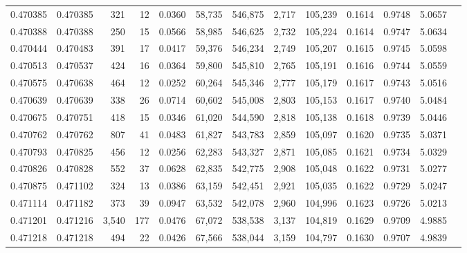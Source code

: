 \begin{tabular}{rrrrrrrrrrrrr}
0.470385 & 0.470385 &   321 &    12 &                                     0.0360 &  58,735 & 546,875 &   2,717 & 105,239 & 0.1614 & 0.9748 & 5.0657 \\
0.470388 & 0.470388 &   250 &    15 &                                     0.0566 &  58,985 & 546,625 &   2,732 & 105,224 & 0.1614 & 0.9747 & 5.0634 \\
0.470444 & 0.470483 &   391 &    17 &                                     0.0417 &  59,376 & 546,234 &   2,749 & 105,207 & 0.1615 & 0.9745 & 5.0598 \\
0.470513 & 0.470537 &   424 &    16 &                                     0.0364 &  59,800 & 545,810 &   2,765 & 105,191 & 0.1616 & 0.9744 & 5.0559 \\
0.470575 & 0.470638 &   464 &    12 &                                     0.0252 &  60,264 & 545,346 &   2,777 & 105,179 & 0.1617 & 0.9743 & 5.0516 \\
0.470639 & 0.470639 &   338 &    26 &                                     0.0714 &  60,602 & 545,008 &   2,803 & 105,153 & 0.1617 & 0.9740 & 5.0484 \\
0.470675 & 0.470751 &   418 &    15 &                                     0.0346 &  61,020 & 544,590 &   2,818 & 105,138 & 0.1618 & 0.9739 & 5.0446 \\
0.470762 & 0.470762 &   807 &    41 &                                     0.0483 &  61,827 & 543,783 &   2,859 & 105,097 & 0.1620 & 0.9735 & 5.0371 \\
0.470793 & 0.470825 &   456 &    12 &                                     0.0256 &  62,283 & 543,327 &   2,871 & 105,085 & 0.1621 & 0.9734 & 5.0329 \\
0.470826 & 0.470828 &   552 &    37 &                                     0.0628 &  62,835 & 542,775 &   2,908 & 105,048 & 0.1622 & 0.9731 & 5.0277 \\
0.470875 & 0.471102 &   324 &    13 &                                     0.0386 &  63,159 & 542,451 &   2,921 & 105,035 & 0.1622 & 0.9729 & 5.0247 \\
0.471114 & 0.471182 &   373 &    39 &                                     0.0947 &  63,532 & 542,078 &   2,960 & 104,996 & 0.1623 & 0.9726 & 5.0213 \\
0.471201 & 0.471216 & 3,540 &   177 &                                     0.0476 &  67,072 & 538,538 &   3,137 & 104,819 & 0.1629 & 0.9709 & 4.9885 \\
0.471218 & 0.471218 &   494 &    22 &                                     0.0426 &  67,566 & 538,044 &   3,159 & 104,797 & 0.1630 & 0.9707 & 4.9839 \\

\end{tabular}
